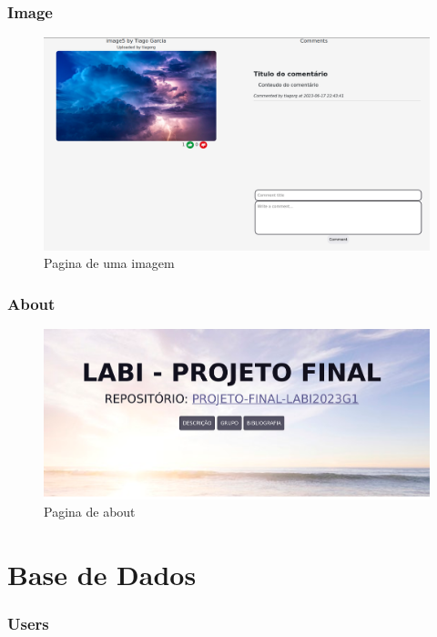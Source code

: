 \documentclass{report}
\begin{document}
\subsubsection{Image}

\begin{figure}[H]
    \centering
    \includegraphics[scale=0.2]{../images/image}
    \caption{Pagina de uma imagem}
    \label{fig:image}
\end{figure}

\subsubsection{About}

\begin{figure}[H]
    \centering
    \includegraphics[scale=0.2]{../images/About}
    \caption{Pagina de about}
    \label{fig:about}
\end{figure}

\section{Base de Dados}

\subsubsection{Users}
\end{document}

